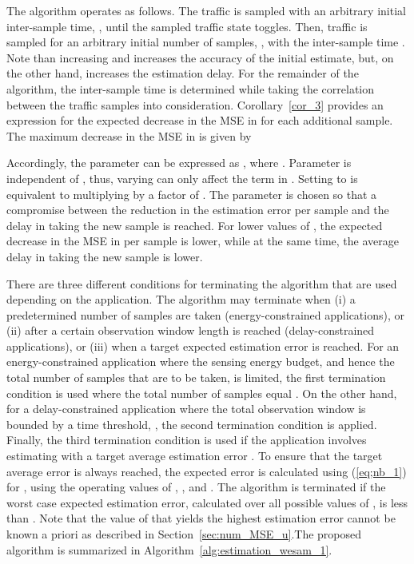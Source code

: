 \documentclass[11pt,draftclsnofoot,journal,onecolumn]{IEEEtran}
\begin{document}
The algorithm operates as follows. The traffic is sampled with an arbitrary initial inter-sample time, , until the sampled traffic state toggles. Then, traffic is sampled for an arbitrary initial number of samples, , with the inter-sample time . Note than increasing  and  increases the accuracy of the initial estimate, but, on the other hand, increases the estimation delay. For the remainder of the algorithm, the inter-sample time is determined while taking the correlation between the traffic samples into consideration. Corollary~\ref{cor_3} provides an expression for the expected decrease in the MSE in  for each additional sample. The maximum decrease in the MSE in  is given by

Accordingly, the parameter  can be expressed as , where . Parameter  is independent of , thus, varying  can only affect the  term in . Setting  to  is equivalent to multiplying  by a factor of . The parameter  is chosen so that a compromise between the reduction in the estimation error per sample and the delay in taking the new sample is reached. For lower values of , the expected decrease in the MSE in  per sample is lower, while at the same time, the average delay in taking the new sample is lower.

There are three different conditions for terminating the algorithm that are used depending on the application. The algorithm may terminate when (i) a predetermined number of samples are taken (energy-constrained applications), or (ii) after a certain observation window length is reached (delay-constrained applications), or (iii) when a target expected estimation error is reached. For an energy-constrained application where the sensing energy budget, and hence the total number of samples that are to be taken, is limited, the first termination condition is used where the total number of samples equal . On the other hand, for a delay-constrained application where the total observation window is bounded by a time threshold, , the second termination condition is applied. Finally, the third termination condition is used if the application involves estimating  with a target average estimation error . To ensure that the target average error is always reached, the expected error is calculated using (\ref{eq;nb_1}) for , using the operating values of , , and . The algorithm is terminated if the worst case expected estimation error, calculated over all possible values of , is less than . Note that the value of  that yields the highest estimation error cannot be known a priori as described in Section~\ref{sec:num_MSE_u}.The proposed algorithm is summarized in Algorithm~\ref{alg:estimation_wesam_1}.
\end{document}
